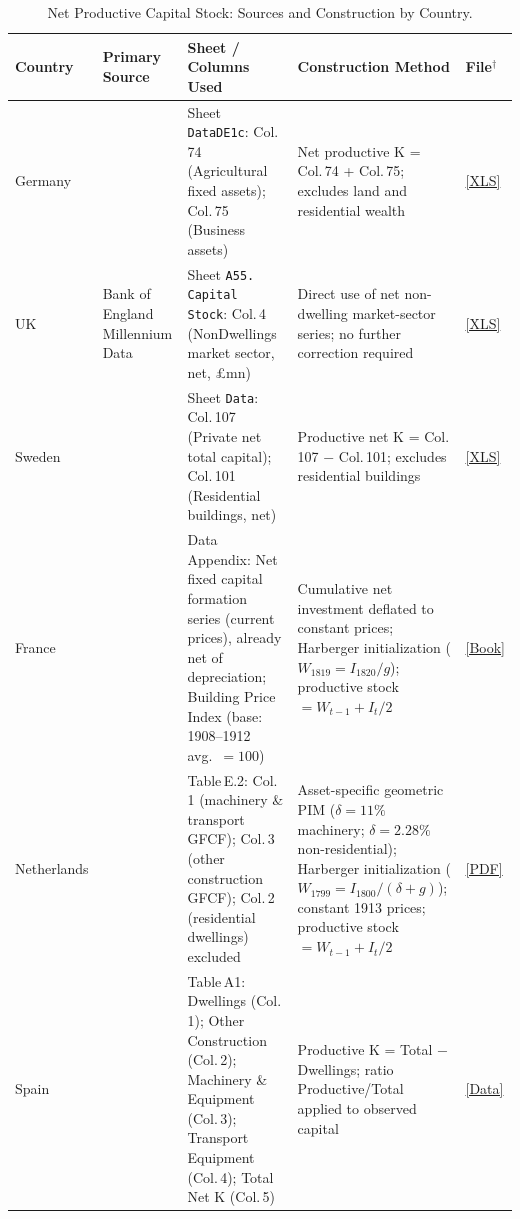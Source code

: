 \documentclass[10pt]{article}
\begin{document}
\begin{table}[!htbp]
\centering
\small
\caption{Net Productive Capital Stock: Sources and Construction by Country.}
\label{tab:capital_construction}
\begin{tabular}{p{1.5cm} p{2.8cm} p{4.0cm} p{3.3cm} p{1.3cm}}
\toprule
\textbf{Country} & \textbf{Primary Source} & \textbf{Sheet / Columns Used} & \textbf{Construction Method} & \textbf{File$^{\dagger}$} \\
\midrule
Germany & \citet{PikettyZucman2014} & Sheet \texttt{DataDE1c}: Col.\,74 (Agricultural fixed assets); Col.\,75 (Business assets) & Net productive K = Col.\,74 + Col.\,75; excludes land and residential wealth & \href{http://piketty.pse.ens.fr/files/capitalisback/Germany.xls}{[XLS]} \\[4pt]
UK & Bank of England Millennium Data & Sheet \texttt{A55. Capital Stock}: Col.\,4 (NonDwellings market sector, net, \pounds mn) & Direct use of net non-dwelling market-sector series; no further correction required & \href{https://www.bankofengland.co.uk/-/media/boe/files/statistics/research-datasets/a-millennium-of-macroeconomic-data-for-the-uk.xlsx}{[XLS]} \\[4pt]
Sweden & \citet{Edvinsson2016} & Sheet \texttt{Data}: Col.\,107 (Private net total capital); Col.\,101 (Residential buildings, net) & Productive net K = Col.\,107 $-$ Col.\,101; excludes residential buildings & \href{http://www.historia.se/tablesAtoX.xls}{[XLS]} \\[4pt]
France & \citet{levy2008french} & Data Appendix: Net fixed capital formation series (current prices), already net of depreciation; Building Price Index (base: 1908--1912 avg.\ $=100$) & Cumulative net investment deflated to constant prices; Harberger initialization ($W_{1819}=I_{1820}/g$); productive stock $= W_{t-1} + I_t/2$ & \href{https://www.cambridge.org/core/books/french-economy-in-the-nineteenth-century/}{[Book]} \\[4pt]
Netherlands & \citet{SmitsHorlingsZanden2000} & Table\,E.2: Col.\,1 (machinery \& transport GFCF); Col.\,3 (other construction GFCF); Col.\,2 (residential dwellings) excluded & Asset-specific geometric PIM ($\delta=11\%$ machinery; $\delta=2.28\%$ non-residential); Harberger initialization ($W_{1799}=I_{1800}/(\delta+g)$); constant 1913 prices; productive stock $= W_{t-1} + I_t/2$ & \href{https://nationalaccounts.niwi.knaw.nl/intro.htm}{[PDF]} \\[4pt]
Spain & \citet{PradosEscosura2022} & Table\,A1: Dwellings (Col.\,1); Other Construction (Col.\,2); Machinery \& Equipment (Col.\,3); Transport Equipment (Col.\,4); Total Net K (Col.\,5) & Productive K = Total $-$ Dwellings; ratio Productive/Total applied to observed capital & \href{https://repositorio.bde.es/handle/123456789/18693?locale=en}{[Data]} \\[4pt]

\end{tabular}
\end{table}
\end{document}
